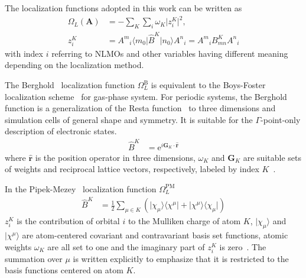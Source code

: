 \documentclass[aps,prl,reprint,amsmath,amssymb]{revtex4-1}
\newcommand*{\imi}{i} %
\newcommand*{\E}{\mathrm{e}}
\newcommand{\ket}[1]{\ensuremath{\vert #1 \rangle}}
\newcommand{\bra}[1]{\ensuremath{\langle #1 \vert}}
\newcommand{\ketbra}[2]{\ensuremath{\vert #1 \rangle \langle #2 \vert}} %
\newcommand{\op}[1]{\ensuremath{\hat{#1}}} %
\begin{document}
The localization functions adopted in this work can be written as
%
\begin{equation} \label{eq:fun-loc}
\begin{split}
\Omega_L(\mathbf{A}) &= - \sum_K \sum_i \omega_K \vert z_{i}^{K} \vert^2, \\
z_{i}^{K} & =  {A^m}_i \bra{m_0} \op{B}^K \ket{n_0} {A^n}_i = {A^m}_i B^{K}_{mn} {A^n}_i
\end{split}
\end{equation}
%
with index $i$ referring to NLMOs and other variables having different meaning depending on the localization method. 

The Berghold~\cite{berghold2000general} localization function $\Omega_L^{\text{B}}$ is equivalent to the Boys-Foster localization scheme~\cite{berghold2000general, resta1999electron} for gas-phase system. For periodic systems, the Berghold function is a generalization of the Resta function~\cite{resta1998quantum, resta1999electron} to three dimensions and simulation cells of general shape and symmetry. It is suitable for the $\Gamma$-point-only description of electronic states.
%
\begin{equation} \label{eq:berghold}
\begin{split}
\op{B}^{K} &= \E^{\imi \mathbf{G}_K \cdot \mathbf{\op{r}}}
\end{split}
\end{equation}
%
where $\mathbf{\op{r}}$ is the position operator in three dimensions, $\omega_K$ and $\mathbf{G}_K$ are suitable sets of weights and reciprocal lattice vectors, respectively, labeled by index $K$~\cite{silvestrelli1999maximally, berghold2000general}. 

In the Pipek-Mezey~\cite{pipek1989fast,lehtola2014pipek} localization function $\Omega_L^{\text{PM}}$
%
\begin{equation} \label{eq:pipek}
\begin{split}
\op{B}^{K} &= \frac{1}{2} \sum_{\mu \in K} \left( \ketbra{\chi_{\mu}}{\chi^{\mu}} + \ketbra{\chi^{\mu}}{\chi_{\mu}} \right)
\end{split}
\end{equation}
%
$z_{i}^{K}$ is the contribution of orbital $i$ to the Mulliken charge of atom $K$, $\ket{\chi_\mu}$ and $\ket{\chi^\mu}$ are atom-centered covariant and contravariant basis set functions, atomic weights $\omega_K$ are all set to one and the imaginary part of $z_{i}^{K}$ is zero~\cite{silvestrelli1999maximally, berghold2000general}. The summation over $\mu$ is written explicitly to emphasize that it is restricted to the basis functions centered on atom $K$. 
\end{document}
